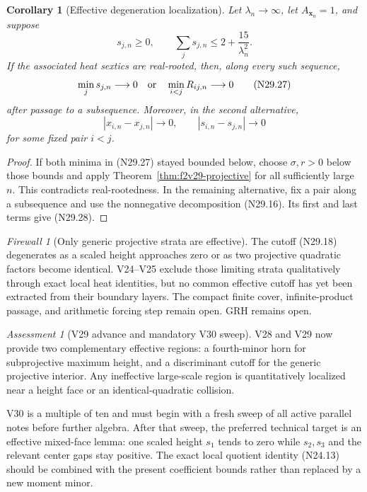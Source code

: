 \documentclass[11pt]{article}
\newtheorem{corollary}[theorem]{Corollary}
\theoremstyle{definition}
\theoremstyle{remark}
\newtheorem{assessment}[theorem]{Assessment}
\newtheorem{firewall}[theorem]{Firewall}
\begin{document}
\begin{corollary}[Effective degeneration localization]
\label{cor:f2v29-localization}
Let \(\lambda_n\to\infty\), let \(A_{\bm x_n}=1\), and suppose
\[
 s_{j,n}\geq0,\qquad
 \sum_js_{j,n}\leq2+\frac{15}{\lambda_n^2}.
 \tag{N29.26}
\]
If the associated heat sextics are real-rooted, then, along every such
sequence,
\[
 \min_j s_{j,n}\longrightarrow0
 \quad\hbox{or}\quad
 \min_{i<j}R_{ij,n}\longrightarrow0
 \tag{N29.27}
\]
after passage to a subsequence.
Moreover, in the second alternative,
\[
 |x_{i,n}-x_{j,n}|\longrightarrow0,\qquad
 |s_{i,n}-s_{j,n}|\longrightarrow0
 \tag{N29.28}
\]
for some fixed pair \(i<j\).
\end{corollary}

\begin{proof}
If both minima in \textup{(N29.27)} stayed bounded below, choose
\(\sigma,r>0\) below those bounds and apply
Theorem~\ref{thm:f2v29-projective} for all sufficiently large \(n\).
This contradicts real-rootedness.  In the remaining alternative, fix a
pair along a subsequence and use the nonnegative decomposition
\textup{(N29.16)}.  Its first and last terms give
\textup{(N29.28)}.
\end{proof}

\begin{firewall}[Only generic projective strata are effective]
\label{fire:f2v29}
The cutoff \textup{(N29.18)} degenerates as a scaled height approaches
zero or as two projective quadratic factors become identical.  V24--V25
exclude those limiting strata qualitatively through exact local heat
identities, but no common effective cutoff has yet been extracted from
their boundary layers.  The compact finite cover, infinite-product
passage, and arithmetic forcing step remain open.  GRH remains open.
\end{firewall}

\begin{assessment}[V29 advance and mandatory V30 sweep]
\label{ass:f2v29}
V28 and V29 now provide two complementary effective regions: a
fourth-minor horn for subprojective maximum height, and a discriminant
cutoff for the generic projective interior.  Any ineffective large-scale
region is quantitatively localized near a height face or an
identical-quadratic collision.

V30 is a multiple of ten and must begin with a fresh sweep of all active
parallel notes before further algebra.  After that sweep, the preferred
technical target is an effective mixed-face lemma: one scaled height
\(s_1\) tends to zero while \(s_2,s_3\) and the relevant center gaps stay
positive.  The exact local quotient identity \textup{(N24.13)} should be
combined with the present coefficient bounds rather than replaced by a
new moment minor.
\end{assessment}
\end{document}
